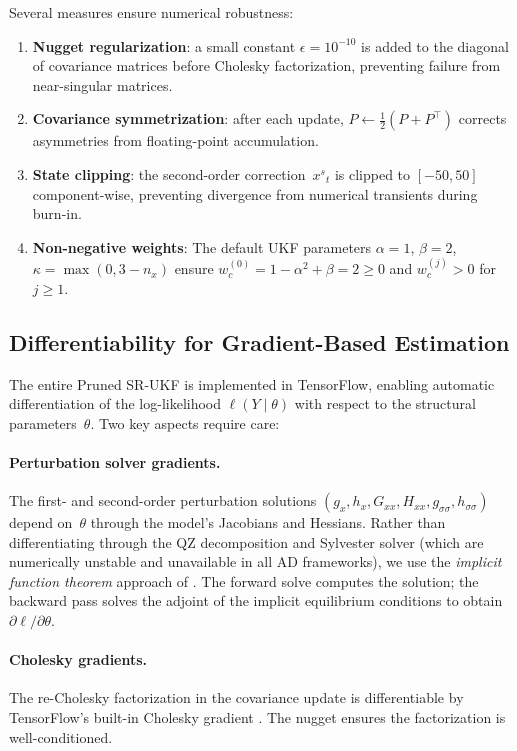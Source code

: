 \documentclass[12pt,a4paper]{article}
\newcommand{\xs}{{x^{s}}}
\newcommand{\gx}{g_x}
\newcommand{\hx}{h_x}
\newcommand{\Gxx}{G_{xx}}
\newcommand{\Hxx}{H_{xx}}
\newcommand{\gss}{{g_{\sigma\sigma}}}
\newcommand{\hsig}{{h_{\sigma\sigma}}}
\begin{document}
Several measures ensure numerical robustness:
\begin{enumerate}[nosep]
\item \textbf{Nugget regularization}: a small constant
$\epsilon = 10^{-10}$ is added to the diagonal of covariance matrices
before Cholesky factorization, preventing failure from near-singular
matrices.
\item \textbf{Covariance symmetrization}: after each update,
$P \leftarrow \tfrac{1}{2}(P + P^\top)$ corrects asymmetries from
floating-point accumulation.
\item \textbf{State clipping}: the second-order correction~$\xs_t$
is clipped to $[-50, 50]$ component-wise, preventing divergence from
numerical transients during burn-in.
\item \textbf{Non-negative weights}: The default UKF parameters
$\alpha = 1$, $\beta = 2$, $\kappa = \max(0, 3 - n_x)$ ensure
$w_c^{(0)} = 1 - \alpha^2 + \beta = 2 \geq 0$ and $w_c^{(j)} > 0$
for $j \geq 1$.
\end{enumerate}

\subsection{Differentiability for Gradient-Based Estimation}

The entire Pruned SR-UKF is implemented in TensorFlow, enabling
automatic differentiation of the log-likelihood
$\ell(Y \mid \theta)$ with respect to the structural
parameters~$\theta$. Two key aspects require care:

\paragraph{Perturbation solver gradients.}
The first- and second-order perturbation solutions
$(\gx, \hx, \Gxx, \Hxx, \gss, \hsig)$ depend on~$\theta$ through
the model's Jacobians and Hessians. Rather than differentiating
through the QZ decomposition and Sylvester solver (which are
numerically unstable and unavailable in all AD frameworks), we use
the \emph{implicit function theorem} approach of
\citet{childers2024differentiable}. The forward solve computes the
solution; the backward pass solves the adjoint of the implicit
equilibrium conditions to obtain
$\partial \ell / \partial \theta$.

\paragraph{Cholesky gradients.}
The re-Cholesky factorization in the covariance update is
differentiable by TensorFlow's built-in Cholesky gradient
\citep{murray2016differentiation}. The nugget ensures the
factorization is well-conditioned.
\end{document}
